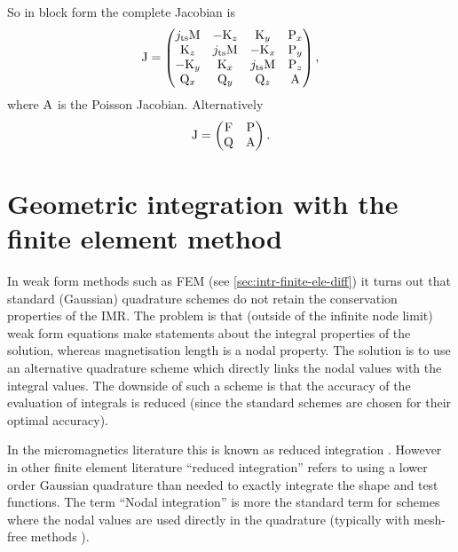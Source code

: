 So in block form the complete Jacobian is
\begin{equation}
  \mathrm{J} =
  \begin{pmatrix}
    j_\text{ts} \mathrm{M}    & -\mathrm{K}_z       & \mathrm{K}_y      & \mathrm{P}_x \\
    \mathrm{K}_z         & j_\text{ts}\mathrm{M}    & -\mathrm{K}_x     & \mathrm{P}_y \\
    -\mathrm{K}_y        & \mathrm{K}_x      & j_\text{ts} \mathrm{M} & \mathrm{P}_z \\
    \mathrm{Q}_x       & \mathrm{Q}_y      & \mathrm{Q}_z    & \mathrm{A}     \\
  \end{pmatrix},
\end{equation}
where $\mathrm{A}$ is the Poisson Jacobian.
Alternatively
\begin{equation}
\mathrm{J} =
  \begin{pmatrix}
    \mathrm{F}   & \mathrm{P} \\
    \mathrm{Q}   & \mathrm{A} \\
  \end{pmatrix}.
\end{equation}



\section{Geometric integration with the finite element method}
\label{sec:nodal-integration}


In weak form methods such as FEM (see \autoref{sec:intr-finite-ele-diff}) it turns out that standard (\ie Gaussian) quadrature schemes do not retain the conservation properties of the IMR.
The problem is that (outside of the infinite node limit) weak form equations make statements about the integral properties of the solution, whereas magnetisation length is a nodal property.
The solution is to use an alternative quadrature scheme which directly links the nodal values with the integral values.
The downside of such a scheme is that the accuracy of the evaluation of integrals is reduced (since the standard schemes are chosen for their optimal accuracy).

In the micromagnetics literature this is known as reduced integration \cite{Cimrak2008}.
However in other finite element literature ``reduced integration'' refers to using a lower order Gaussian quadrature than needed to exactly integrate the shape and test functions.
The term ``Nodal integration'' is more the standard term for schemes where the nodal values are used directly in the quadrature (typically with mesh-free methods \eg \cite{Puso2008}).

